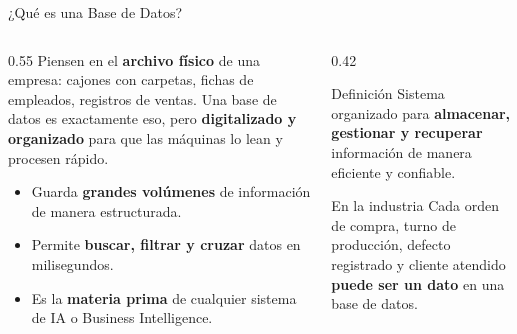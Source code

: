 \documentclass[aspectratio=169]{beamer}
\begin{document}
\begin{frame}{¿Qué es una Base de Datos?}
  \begin{columns}[T]
    \begin{column}{0.55\textwidth}
      \small
      Piensen en el \textbf{archivo físico} de una empresa: cajones con carpetas, fichas de empleados, registros de ventas.
      Una base de datos es exactamente eso, pero \textbf{digitalizado y organizado} para que las máquinas lo lean y procesen rápido.

      \vspace{0.4cm}
      \begin{itemize}\setlength\itemsep{5pt}
        \item Guarda \textbf{grandes volúmenes} de información de manera estructurada.
        \item Permite \textbf{buscar, filtrar y cruzar} datos en milisegundos.
        \item Es la \textbf{materia prima} de cualquier sistema de IA o Business Intelligence.
      \end{itemize}
    \end{column}
    \begin{column}{0.42\textwidth}
      \begin{conceptbox}{\faDatabase\enspace Definición}
        \small
        Sistema organizado para \textbf{almacenar, gestionar y recuperar} información de manera eficiente y confiable.
      \end{conceptbox}
      \vspace{0.3cm}
      \begin{alertblock}{\faIndustry\enspace En la industria}
        \small
        Cada orden de compra, turno de producción, defecto registrado y cliente atendido \textbf{puede ser un dato} en una base de datos.
      \end{alertblock}
    \end{column}
  \end{columns}
\end{frame}
\end{document}
